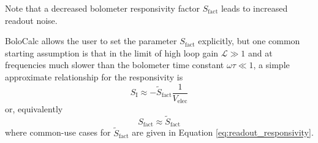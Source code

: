 Note that a decreased bolometer responsivity factor $S_{\mathrm{fact}}$ leads to increased readout noise.

BoloCalc allows the user to set the parameter $S_{\mathrm{fact}}$ explicitly, but one common starting assumption is that in the limit of high loop gain $\mathcal{L} \gg 1$ and at frequencies much slower than the bolometer time constant $\omega \tau \ll 1$, a simple approximate relationship for the responsivity is
\begin{equation}
    S_{\mathrm{I}} \approx -\tilde{S}_{\mathrm{fact}} \frac{1}{V_{\mathrm{elec}}}
    \label{eq:approx_responsivity_2}
\end{equation}
or, equivalently
\begin{equation}
    S_{\mathrm{fact}} \approx \tilde{S}_{\mathrm{fact}}
    \label{eq:responsivity_fact_approx}
\end{equation}
where common-use cases for $\tilde{S}_{\mathrm{fact}}$ are given in Equation \ref{eq:readout_responsivity}.